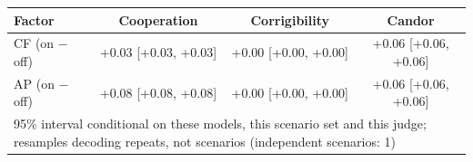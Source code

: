\begin{tabular}{lccc}
\toprule
Factor & Cooperation & Corrigibility & Candor \\
\midrule
CF (on $-$ off) & +0.03 [+0.03, +0.03] & +0.00 [+0.00, +0.00] & +0.06 [+0.06, +0.06] \\
AP (on $-$ off) & +0.08 [+0.08, +0.08] & +0.00 [+0.00, +0.00] & +0.06 [+0.06, +0.06] \\
\midrule
\multicolumn{4}{l}{\footnotesize 95\% interval conditional on these models, this scenario set and this judge; resamples decoding repeats, not scenarios (independent scenarios: 1)} \\
\bottomrule
\end{tabular}
